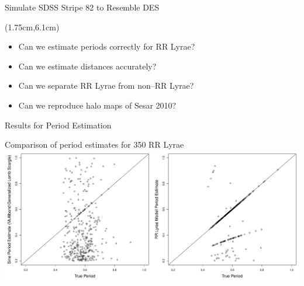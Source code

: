 \documentclass[12pt]{beamer}
\begin{document}
\begin{frame}{Simulate SDSS Stripe 82 to Resemble DES}
  \begin{textblock*}{12cm}(1.75cm,6.1cm) %
\begin{itemize}
\item Can we estimate periods correctly for RR Lyrae?
\item Can we estimate distances accurately?
\item Can we separate RR Lyrae from non--RR Lyrae? 
\item Can we reproduce halo maps of Sesar 2010?
\end{itemize}
\end{textblock*}

\end{frame}


\begin{frame}{Results for Period Estimation}



\begin{center}
Comparison of period estimates for 350 RR Lyrae\\
\includegraphics[scale=.25]{figs/period_comparison.pdf}
\end{center}



\end{frame}
\end{document}
